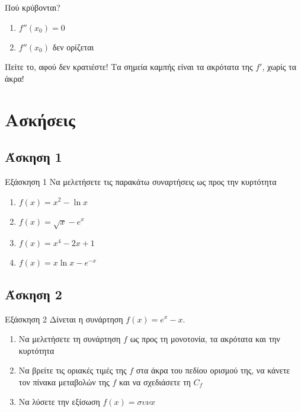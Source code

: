 \documentclass[greek]{beamer}
\begin{document}
\begin{frame}{Πού κρύβονται?}
 \begin{enumerate}
  \item<1-> $f''(x_0)=0$
  \item<2-> $f''(x_0)$ δεν ορίζεται
 \end{enumerate}
  {Πείτε το, αφού δεν κρατιέστε! Τα σημεία καμπής είναι τα ακρότατα της $f'$, χωρίς τα άκρα!}
\end{frame}

\section{Ασκήσεις}
\subsection{Άσκηση 1}
\begin{frame}[label=Άσκηση1,t]{Εξάσκηση 1}
 Να μελετήσετε τις παρακάτω συναρτήσεις ως προς την κυρτότητα
 \begin{enumerate}
   \item<1-> $f(x)=x^2-\ln x$
   \item<2-> $f(x)=\sqrt{x}-e^x$
   \item<3-> $f(x)=x^4-2x+1$
   \item<4-> $f(x)=x\ln x-e^{-x}$
 \end{enumerate}

\end{frame}

\subsection{Άσκηση 2}
\begin{frame}[label=Άσκηση2,t]{Εξάσκηση 2}
 Δίνεται η συνάρτηση $f(x)=e^x-x$.
 \begin{enumerate}
   \item<1-> Να μελετήσετε τη συνάρτηση $f$ ως προς τη μονοτονία, τα ακρότατα και την κυρτότητα
   \item<2-> Να βρείτε τις οριακές τιμές της $f$ στα άκρα του πεδίου ορισμού της, να κάνετε τον πίνακα μεταβολών της $f$ και να σχεδιάσετε τη $C_f$
   \item<3-> Να λύσετε την εξίσωση $f(x)=συνx$
 \end{enumerate}

\end{frame}
\end{document}
